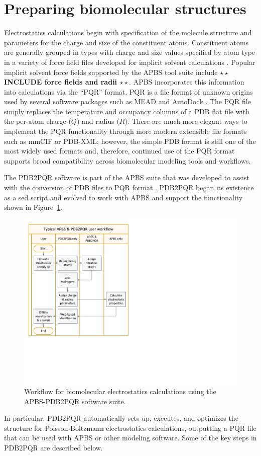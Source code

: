 \documentclass[11pt,titlepage]{article}
\newcommand{\todo}[1]{\textbf{$\star \star$ {#1} $\star \star$}}
\begin{document}
\section{Preparing biomolecular structures}
Electrostatics calculations begin with specification of the molecule structure and parameters for the charge and size of the constituent atoms.
Constituent atoms are generally grouped in types with charge and size values specified by atom type in a variety of force field files developed for implicit solvent calculations \cite{Ren2012}.
Popular implicit solvent force fields supported by the APBS tool suite include \todo{INCLUDE force fields and radii}.
APBS incorporates this information into calculations via the ``PQR'' format.
PQR is a file format of unknown origins used by several software packages such as MEAD \cite{MEAD} and AutoDock \cite{AutoDock}. 
The PQR file simply replaces the temperature and occupancy columns of a PDB flat file \cite{PDB} with the per-atom charge ($Q$) and radius ($R$).
There are much more elegant ways to implement the PQR functionality through more modern extensible file formats such as mmCIF \cite{mmCIF} or PDB-XML; however, the simple PDB format is still one of the most widely used formats and, therefore, continued use of the PQR format supports broad compatibility across biomolecular modeling tools and workflows.

The PDB2PQR software is part of the APBS suite that was developed to assist with the conversion of PDB files to PQR format \cite{Dolinsky2004, Dolinsky2007}.
PDB2PQR began its existence as a sed \cite{sed} script and evolved to work with APBS and support the functionality shown in Figure~\ref{fig:PDB2PQR-APBS}.
\begin{figure}
	\centering
	\includegraphics[width=0.60\linewidth]{APBS-and-PDB2PQR-user-flow} 
	\caption{Workflow for biomolecular electrostatics calculations using the APBS-PDB2PQR software suite.}
	\label{fig:PDB2PQR-APBS}
\end{figure}
In particular, PDB2PQR automatically sets up, executes, and optimizes the structure for Poisson-Boltzmann electrostatics calculations, outputting a PQR file that can be used with APBS or other modeling software.
Some of the key steps in PDB2PQR are described below.
\end{document}

